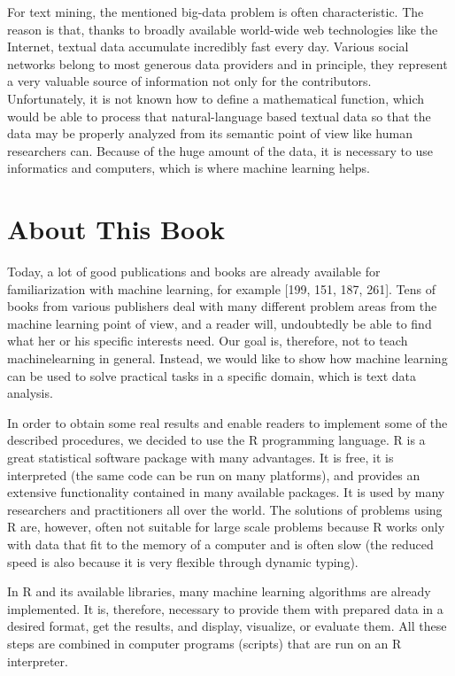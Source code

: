 \documentclass[11pt,openany,executivepaper]{book}
\begin{document}
For text mining, the mentioned big-data problem is often characteristic. The reason is that, thanks to broadly available world-wide web technologies like the Internet, textual data accumulate incredibly fast every day. Various social networks belong to most generous data providers and in principle, they represent a very valuable source of information not only for the contributors. Unfortunately, it is not known how to define a mathematical function, which would be able to process that natural-language based textual data so that the data may be properly analyzed from its semantic point of view like human researchers can. Because of the huge amount of the data, it is necessary to use informatics and computers, which is where machine learning helps.

\section{About This Book}
Today, a lot of good publications and books are already available for familiarization with machine learning, for example [199, 151, 187, 261]. Tens of books from various publishers deal with many different problem areas from the machine learning point of view, and a reader will, undoubtedly be able to find what her or his specific interests need. Our goal is, therefore, not to teach machinelearning in general. Instead, we would like to show how machine learning can be used to solve practical tasks in a specific domain, which is text data analysis.

In order to obtain some real results and enable readers to implement some of the described procedures, we decided to use the R programming language. R is a great statistical software package with many advantages. It is free, it is interpreted (the same code can be run on many platforms), and provides an extensive functionality contained in many available packages. It is used by many researchers and practitioners all over the world. The solutions of problems using R are, however, often not suitable for large scale problems because R works only with data that fit to the memory of a computer and is often slow (the reduced speed is also because it is very flexible through dynamic typing).

In R and its available libraries, many machine learning algorithms are already implemented. It is, therefore, necessary to provide them with prepared data in a desired format, get the results, and display, visualize, or evaluate them. All these steps are combined in computer programs (scripts) that are run on an R interpreter.
\end{document}
